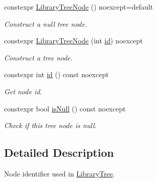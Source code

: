 \begin{DoxyCompactItemize}
\item 
constexpr \hyperlink{class_mdt_1_1_deploy_utils_1_1_library_tree_node_aacfee766b6cb39f40f9f50eb13f5df89}{Library\+Tree\+Node} () noexcept=default\hypertarget{class_mdt_1_1_deploy_utils_1_1_library_tree_node_aacfee766b6cb39f40f9f50eb13f5df89}{}\label{class_mdt_1_1_deploy_utils_1_1_library_tree_node_aacfee766b6cb39f40f9f50eb13f5df89}

\begin{DoxyCompactList}\small\item\em Construct a null tree node. \end{DoxyCompactList}\item 
constexpr \hyperlink{class_mdt_1_1_deploy_utils_1_1_library_tree_node_af38e2a3d67cf1886cb8d123ef3ac3e95}{Library\+Tree\+Node} (int \hyperlink{class_mdt_1_1_deploy_utils_1_1_library_tree_node_a9037c5b96dbe3566e9d5508c724b4afc}{id}) noexcept\hypertarget{class_mdt_1_1_deploy_utils_1_1_library_tree_node_af38e2a3d67cf1886cb8d123ef3ac3e95}{}\label{class_mdt_1_1_deploy_utils_1_1_library_tree_node_af38e2a3d67cf1886cb8d123ef3ac3e95}

\begin{DoxyCompactList}\small\item\em Construct a tree node. \end{DoxyCompactList}\item 
constexpr int \hyperlink{class_mdt_1_1_deploy_utils_1_1_library_tree_node_a9037c5b96dbe3566e9d5508c724b4afc}{id} () const noexcept\hypertarget{class_mdt_1_1_deploy_utils_1_1_library_tree_node_a9037c5b96dbe3566e9d5508c724b4afc}{}\label{class_mdt_1_1_deploy_utils_1_1_library_tree_node_a9037c5b96dbe3566e9d5508c724b4afc}

\begin{DoxyCompactList}\small\item\em Get node id. \end{DoxyCompactList}\item 
constexpr bool \hyperlink{class_mdt_1_1_deploy_utils_1_1_library_tree_node_a40ab57463b9ba93f9cc0b6b7ab33aed8}{is\+Null} () const noexcept
\begin{DoxyCompactList}\small\item\em Check if this tree node is null. \end{DoxyCompactList}\end{DoxyCompactItemize}


\subsection{Detailed Description}
Node identifier used in \hyperlink{class_mdt_1_1_deploy_utils_1_1_library_tree}{Library\+Tree}. 

